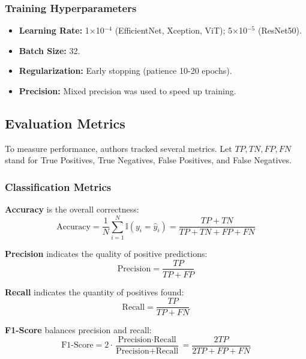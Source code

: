 \documentclass[runningheads]{llncs}
\begin{document}
\subsubsection{Training Hyperparameters}
\begin{itemize}
    \item \textbf{Learning Rate:} 1$\times$10$^{-4}$ (EfficientNet, Xception, ViT); 5$\times$10$^{-5}$ (ResNet50).
    \item \textbf{Batch Size:} 32.
    \item \textbf{Regularization:} Early stopping (patience 10-20 epochs).
    \item \textbf{Precision:} Mixed precision was used to speed up training.
\end{itemize}

\subsection{Evaluation Metrics}
To measure performance, authors tracked several metrics. Let $TP, TN, FP, FN$ stand for True Positives, True Negatives, False Positives, and False Negatives.

\subsubsection{Classification Metrics}
\textbf{Accuracy} is the overall correctness:
\begin{equation}
\text{Accuracy} = \frac{1}{N}\sum_{i=1}^{N}\mathbb{I}(y_i = \hat{y}_i) = \frac{TP + TN}{TP + TN + FP + FN}
\label{eq:accuracy}
\end{equation}

\textbf{Precision} indicates the quality of positive predictions:
\begin{equation}
\text{Precision} = \frac{TP}{TP + FP}
\label{eq:precision}
\end{equation}

\textbf{Recall} indicates the quantity of positives found:
\begin{equation}
\text{Recall} = \frac{TP}{TP + FN}
\label{eq:recall}
\end{equation}

\textbf{F1-Score} balances precision and recall:
\begin{equation}
\text{F1-Score} = 2 \cdot \frac{\text{Precision} \cdot \text{Recall}}{\text{Precision} + \text{Recall}} = \frac{2TP}{2TP + FP + FN}
\label{eq:f1}
\end{equation}
\end{document}
